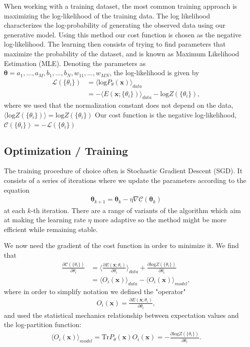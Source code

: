 \documentclass[%
oneside,                 %
final,                   %
10pt]{article}
\begin{document}
When working with a training dataset, the most common training approach is maximizing the log-likelihood of the training data. The log likelihood characterizes the log-probability of generating the observed data using our generative model. Using this method our cost function is chosen as the negative log-likelihood. The learning then consists of trying to find parameters that maximize the probability of the dataset, and is known as Maximum Likelihood Estimation (MLE).
Denoting the parameters as $\bm{\theta} = a_1,...,a_M,b_1,...,b_N,w_{11},...,w_{MN}$, the log-likelihood is given by
\begin{align}
	\mathcal{L}(\{ \theta_i \}) &= \langle \text{log} P_\theta(\bm{x}) \rangle_{data} \\
	&= - \langle E(\bm{x}; \{ \theta_i\}) \rangle_{data} - \text{log} Z(\{ \theta_i\}),
\end{align}
where we used that the normalization constant does not depend on the data, $\langle \text{log} Z(\{ \theta_i\}) \rangle = \text{log} Z(\{ \theta_i\})$
Our cost function is the negative log-likelihood, $\mathcal{C}(\{ \theta_i \}) = - \mathcal{L}(\{ \theta_i \})$

\subsection{Optimization / Training}
The training procedure of choice often is Stochastic Gradient Descent (SGD). It consists of a series of iterations where we update the parameters according to the equation
\begin{align}
	\bm{\theta}_{k+1} = \bm{\theta}_k - \eta \nabla \mathcal{C} (\bm{\theta}_k)
\end{align}
at each $k$-th iteration. There are a range of variants of the algorithm which aim at making the learning rate $\eta$ more adaptive so the method might be more efficient while remaining stable.

We now need the gradient of the cost function in order to minimize it. We find that
\begin{align}
	\frac{\partial \mathcal{C}(\{ \theta_i\})}{\partial \theta_i}
	&= \langle \frac{\partial E(\bm{x}; \theta_i)}{\partial \theta_i} \rangle_{data}
	+ \frac{\partial \text{log} Z(\{ \theta_i\})}{\partial \theta_i} \\
	&= \langle O_i(\bm{x}) \rangle_{data} - \langle O_i(\bm{x}) \rangle_{model},
\end{align}
where in order to simplify notation we defined the "operator"
\begin{align}
	O_i(\bm{x}) = \frac{\partial E(\bm{x}; \theta_i)}{\partial \theta_i}, 
\end{align}
and used the statistical mechanics relationship between expectation values and the log-partition function:
\begin{align}
	\langle O_i(\bm{x}) \rangle_{model} = \text{Tr} P_\theta(\bm{x})O_i(\bm{x}) = - \frac{\partial \text{log} Z(\{ \theta_i\})}{\partial \theta_i}.
\end{align}
\end{document}
